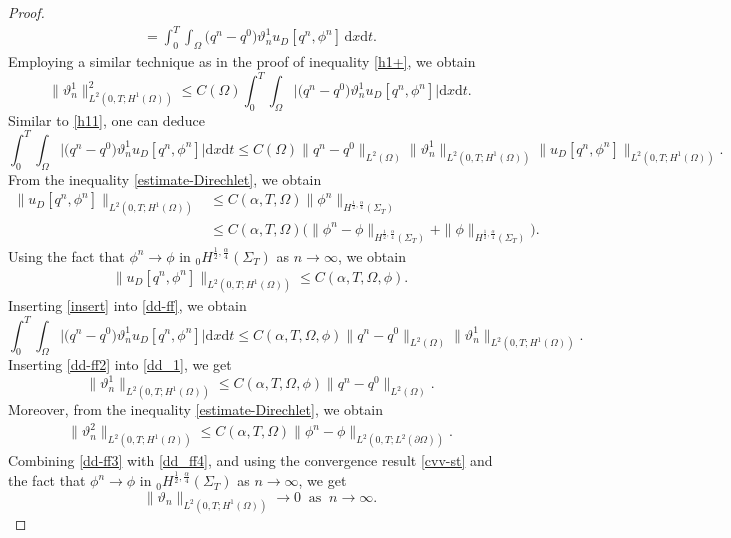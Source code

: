 \documentclass[10pt,a4paper]{amsart}
\newcommand{\dt} {\displaystyle\mathrm{d}t}
\newcommand{\dx} {\displaystyle\mathrm{d}x}
\begin{document}
\begin{proof}
\begin{align*}
    = \int_0^T \int_\Omega \Big(q^n - q^0\Big) \vartheta_n^1 u_D[q^n, \phi^n] \, \dx \dt.
\end{align*}
Employing a similar technique as in the proof of inequality \eqref{h1+}, we obtain
\begin{equation} \label{dd_1}
    \|\vartheta_n^1\|_{L^2(0, T; H^1(\Omega))}^2 \leq C(\Omega) \int_0^T \int_\Omega \Big|\Big(q^n - q^0\Big) \vartheta_n^1 u_D[q^n, \phi^n]\Big| \dx \dt.
\end{equation}
Similar to \eqref{h11}, one can deduce
\begin{equation}\label{dd-ff}
    \int_0^T \int_\Omega \Big|\Big(q^n - q^0\Big) \vartheta_n^1 u_D[q^n, \phi^n]\Big| \dx \dt \leq C(\Omega) \|q^n - q^0\|_{L^2(\Omega)} \|\vartheta_n^1\|_{L^2(0, T; H^1(\Omega))} \| u_D[q^n, \phi^n] \|_{L^2(0, T; H^1(\Omega))}.
\end{equation}
From the inequality \eqref{estimate-Direchlet}, we obtain
\begin{align*}
    \| u_D[q^n, \phi^n] \|_{L^2(0, T; H^1(\Omega))} &\leq C(\alpha, T, \Omega) \|\phi^n\|_{H^{\frac{1}{2}, \frac{\alpha}{4}} (\Sigma_T)} \\
    &\leq C(\alpha, T, \Omega) \Big(\|\phi^n - \phi\|_{H^{\frac{1}{2}, \frac{\alpha}{4}} (\Sigma_T)} + \|\phi\|_{H^{\frac{1}{2}, \frac{\alpha}{4}} (\Sigma_T)}\Big).
\end{align*}
Using the fact that \(\phi^n \to \phi\) in \({}_0 H^{\frac{1}{2}, \frac{\alpha}{4}} (\Sigma_T)\) as \(n \to \infty\), we obtain
\begin{align}\label{insert}
    \| u_D[q^n, \phi^n] \|_{L^2(0, T; H^1(\Omega))} \leq C(\alpha, T, \Omega, \phi).
\end{align}
Inserting \eqref{insert} into \eqref{dd-ff}, we obtain
\begin{equation}\label{dd-ff2}
    \int_0^T \int_\Omega \Big|\Big(q^n - q^0\Big) \vartheta_n^1 u_D[q^n, \phi^n]\Big| \dx \dt \leq C(\alpha, T, \Omega, \phi) \|q^n - q^0\|_{L^2(\Omega)} \|\vartheta_n^1\|_{L^2(0, T; H^1(\Omega))}.
\end{equation}
Inserting \eqref{dd-ff2} into \eqref{dd_1}, we get
\begin{equation}\label{dd-ff3}
    \|\vartheta_n^1\|_{L^2(0, T; H^1(\Omega))} \leq C(\alpha, T, \Omega,\phi) \|q^n - q^0\|_{L^2(\Omega)}.
\end{equation}
Moreover, from the inequality \eqref{estimate-Direchlet}, we obtain
\begin{align} \label{dd_ff4}
    \|\vartheta_n^2\|_{L^2(0, T; H^1(\Omega))} \leq C(\alpha, T, \Omega) \|\phi^n - \phi\|_{L^2(0, T; L^2(\partial\Omega))}.
\end{align}
Combining \eqref{dd-ff3} with \eqref{dd_ff4}, and using the convergence result \eqref{cvv-st} and the fact that $\phi^n \longrightarrow \phi$ in ${}_0 H^{\frac{1}{2}, \frac{\alpha}{4}} (\Sigma_T)$ as $n \longrightarrow \infty$, we get
\begin{equation*}
    \|\vartheta_n\|_{L^2(0, T; H^1(\Omega))} \longrightarrow 0 \;\; \text{as} \;\; n \longrightarrow \infty.
\end{equation*}


\end{proof}
\end{document}
